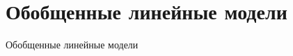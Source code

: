 \documentclass[10pt]{beamer}
\begin{document}

\section{Обобщенные линейные модели}


\begin{frame}{}

\begin{center}
\Large Обобщенные линейные модели
\end{center}

\end{frame}

\end{document}
